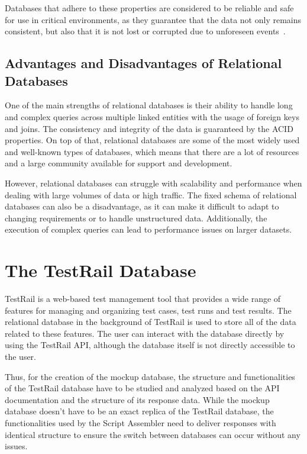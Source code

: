 Databases that adhere to these properties are considered to be reliable and safe for use in critical environments, as they guarantee that the data not only remains consistent, but also that it is not lost or corrupted due to unforeseen events~\cite{WikipediaACID}.

\subsection{Advantages and Disadvantages of Relational Databases}

One of the main strengths of relational databases is their ability to handle long and complex queries across multiple linked entities with the usage of foreign keys and joins. The consistency and integrity of the data is guaranteed by the ACID properties. On top of that, relational databases are some of the most widely used and well-known types of databases, which means that there are a lot of resources and a large community available for support and development. 

However, relational databases can struggle with scalability and performance when dealing with large volumes of data or high traffic. The fixed schema of relational databases can also be a disadvantage, as it can make it difficult to adapt to changing requirements or to handle unstructured data. Additionally, the execution of complex queries can lead to performance issues on larger datasets.

\section{The TestRail Database}

TestRail is a web-based test management tool that provides a wide range of features for managing and organizing test cases, test runs and test results. The relational database in the background of TestRail is used to store all of the data related to these features. The user can interact with the database directly by using the TestRail API, although the database itself is not directly accessible to the user. 

Thus, for the creation of the mockup database, the structure and functionalities of the TestRail database have to be studied and analyzed based on the API documentation and the structure of its response data. While the mockup database doesn't have to be an exact replica of the TestRail database, the functionalities used by the Script Assembler need to deliver responses with identical structure to ensure the switch between databases can occur without any issues.

